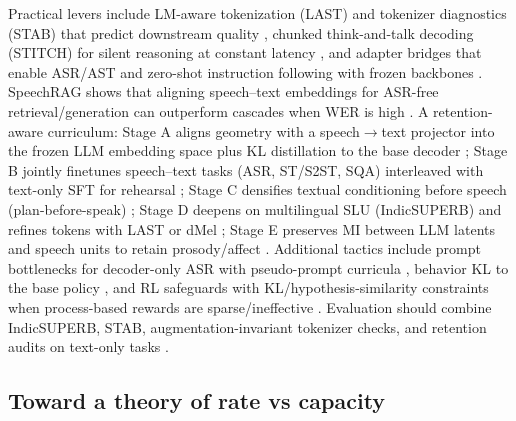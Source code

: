 \documentclass{article}
\begin{document}
Practical levers include LM-aware tokenization (LAST) and tokenizer diagnostics (STAB) that predict downstream quality \cite{turetzky2024lastlanguagemodelawarespeechtokenization,vashishth2024stabspeechtokenizerassessmentbenchmark}, chunked think-and-talk decoding (STITCH) for silent reasoning at constant latency \cite{chiang2025stitchsimultaneousthinkingtalkingchunked}, and adapter bridges that enable ASR/AST and zero-shot instruction following with frozen backbones \cite{wang2023slmbridgethingapbetweenspeechtextfoundat}. SpeechRAG shows that aligning speech--text embeddings for ASR-free retrieval/generation can outperform cascades when WER is high \cite{min2025speechretrievalaugmentedgenerationwithou}. A retention-aware curriculum: Stage A aligns geometry with a speech$\rightarrow$text projector into the frozen LLM embedding space plus KL distillation to the base decoder \cite{turetzky2024lastlanguagemodelawarespeechtokenization,wang2023slmbridgethingapbetweenspeechtextfoundat,hassid2024textuallypretrainedspeechlanguagemodels}; Stage B jointly finetunes speech--text tasks (ASR, ST/S2ST, SQA) interleaved with text-only SFT for rehearsal \cite{peng2024mslms2stmultitaskspeechlanguagemodeltext,peng2025voicetextblenderaugmentinglargelanguagem,wang2023slmbridgethingapbetweenspeechtextfoundat}; Stage C densifies textual conditioning before speech (plan-before-speak) \cite{cui2025thinkbeforeyoutalkenhancingmeaningfuldia}; Stage D deepens on multilingual SLU (IndicSUPERB) and refines tokens with LAST or dMel \cite{entry2025indicsuperbspeechprocessinguniversalperf,turetzky2024lastlanguagemodelawarespeechtokenization,bai2025dmelspeechtokenizationmadesimple}; Stage E preserves MI between LLM latents and speech units to retain prosody/affect \cite{wang2025bossbeyondsemanticspeech}. Additional tactics include prompt bottlenecks for decoder-only ASR with pseudo-prompt curricula \cite{tsunoo2024decoderonlyarchitecturespeechrecognition}, behavior KL to the base policy \cite{wang2024blspemotowardsempatheticlargespeechlangu}, and RL safeguards with KL/hypothesis-similarity constraints when process-based rewards are sparse/ineffective \cite{li2025seewossubmissionmlcslmlessonslearnedspee}. Evaluation should combine IndicSUPERB, STAB, augmentation-invariant tokenizer checks, and retention audits on text-only tasks \cite{vashishth2024stabspeechtokenizerassessmentbenchmark,entry2025augmentationinvariantdiscreterepresentat,entry2025indicsuperbspeechprocessinguniversalperf}.

\subsection{Toward a theory of rate vs capacity} \label{subsec:towardatheoryofratevscapacity}
\end{document}
